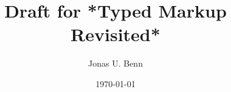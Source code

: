 \documentclass[format=acmsmall, review=true, screen=true, natbib=false]{acmart}
\author{Jonas U. Benn}
\date{\today}
\title{Draft for *Typed Markup Revisited*}
\begin{document}




\maketitle

\clearpage
\vspace*{\fill}
\begin{center}
\cite{blankpage}
\end{center}
\vspace*{\fill}
\clearpage



\printbibliography
\end{document}
